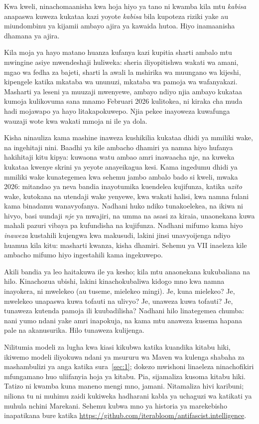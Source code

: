 Kwa kweli, ninachomaanisha kwa hoja hiyo ya tano ni kwamba kila mtu \emph{kabisa} anapaswa kuweza kukataa kazi yoyote \emph{kabisa} bila kupoteza riziki yake au miundombinu ya kijamii ambayo ajira ya kawaida hutoa. Hiyo inamaanisha dhamana ya ajira.

Kila moja ya hayo matano huanza kufanya kazi kupitia sharti ambalo mtu mwingine asiye mwendeshaji huliweka: sheria iliyopitishwa wakati wa amani, mgao wa fedha za bajeti, sharti la awali la mshirika wa muungano wa kijeshi, kipengele katika mkataba wa ununuzi, mkataba wa pamoja wa wafanyakazi. Masharti ya leseni ya muuzaji mwenyewe, ambayo ndiyo njia ambayo kukataa kumoja kulikovuma sana mnamo Februari 2026 kulitokea, ni kiraka cha muda hadi mojawapo ya hayo litakapokuwepo. Njia pekee inayoweza kuwafunga wauzaji wote kwa wakati mmoja ni ile ya dola.

Kisha ninauliza kama mashine inaweza kushikilia kukataa dhidi ya mmiliki wake, na ingehitaji nini. Baadhi ya kile ambacho dhamiri ya namna hiyo hufanya hakihitaji kitu kipya: kuwaona watu ambao amri inawaacha nje, na kuweka kukataa kwenye skrini ya yeyote anayeikagua kesi. Kama ingedumu dhidi ya mmiliki wake kunategemea kwa sehemu jambo ambalo bado si kweli, mwaka 2026: mitandao ya neva bandia inayotumika kuendelea kujifunza, katika \emph{uzito} wake, kutokana na utendaji wake yenyewe, kwa wakati halisi, kwa namna fulani kama binadamu wanavyofanya. Nadhani huko ndiko tunakoelekea, na ikiwa ni hivyo, basi uundaji \emph{nje} ya mwajiri, na umma na asasi za kiraia, unaonekana kuwa mahali pazuri vibaya pa kufundisha na kujifunza. Nadhani mifumo kama hiyo \emph{inaweza} kustahili kujengwa kwa makusudi, lakini jinsi unavyoijenga ndiyo huamua kila kitu: masharti kwanza, kisha dhamiri. Sehemu ya VII inaeleza kile ambacho mifumo hiyo ingestahili kama ingekuwepo.

Akili bandia ya leo haitakuwa ile ya kesho; kila mtu anaonekana kukubaliana na hilo. Kinachozua ubishi, lakini kinachokubaliwa kidogo mno kwa namna inayokera, ni mwelekeo (au tuseme, mielekeo mingi). Je, kuna mielekeo? Je, mwelekeo unapaswa kuwa tofauti na ulivyo? Je, unaweza kuwa tofauti? Je, tunaweza kutenda pamoja ili kuubadilisha? Nadhani hilo linategemea chumba: nani yumo ndani yake amri inapokuja, na kama mtu anaweza kusema hapana pale na akanusurika. Hilo tunaweza kulijenga.

Nilitumia modeli za lugha kwa kiasi kikubwa katika kuandika kitabu hiki, ikiwemo modeli iliyokuwa ndani ya msururu wa Maven wa kulenga shabaha za mashambulizi ya anga katika sura~\ref{sec:1}; dokezo mwishoni linaeleza ninachofikiri mfungamano huo uliifanyia hoja ya kitabu. Pia, sijamaliza kusoma kitabu hiki. Tatizo ni kwamba kuna maneno mengi mno, jamani. Nitamaliza hivi karibuni; niliona tu ni muhimu zaidi kukiweka hadharani kabla ya uchaguzi wa katikati ya muhula nchini Marekani. Sehemu kubwa mno ya historia ya marekebisho inapatikana bure katika \url{https://github.com/iterabloom/antifascist.intelligence}.
